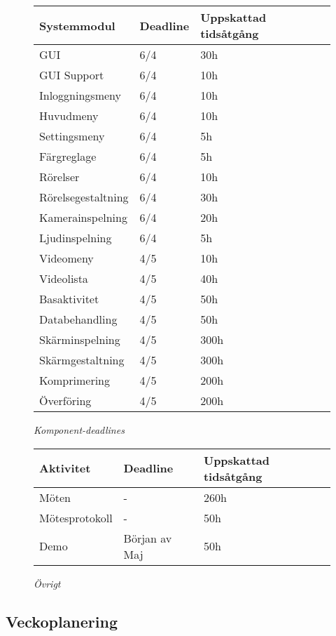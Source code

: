 \begin{figure}[H]
\centering
\begin{tabular}{ | l | l | l |}
  \hline
  \textbf{Systemmodul} & \textbf{Deadline} & \textbf{Uppskattad tidsåtgång} \\ \hline
  GUI & 6/4 & 30h \\ \hline
  GUI Support & 6/4 & 10h \\ \hline
  Inloggningsmeny & 6/4 & 10h \\ \hline
  Huvudmeny & 6/4 & 10h \\ \hline
  Settingsmeny & 6/4 & 5h \\ \hline
  Färgreglage & 6/4 & 5h \\ \hline
  Rörelser & 6/4 & 10h \\ \hline
  Rörelsegestaltning & 6/4 & 30h \\ \hline
  Kamerainspelning & 6/4 & 20h \\ \hline
  Ljudinspelning & 6/4 & 5h \\ \hline
  Videomeny & 4/5 & 10h \\ \hline
  Videolista & 4/5 & 40h \\ \hline
  Basaktivitet & 4/5 & 50h \\ \hline
  Databehandling & 4/5 & 50h \\ \hline
  Skärminspelning & 4/5 & 300h  \\ \hline
  Skärmgestaltning & 4/5 & 300h \\ \hline
  Komprimering & 4/5 & 200h \\ \hline
  Överföring & 4/5 & 200h \\ \hline
\end{tabular}
\caption*{\textit{Komponent-deadlines}}
\end{figure}

\begin{figure}[H]
\centering
\begin{tabular}{ | l | l | l | }
  \hline
  \textbf{Aktivitet} & \textbf{Deadline} & \textbf{Uppskattad tidsåtgång} \\ \hline
  Möten & - & 260h \\ \hline
  Mötesprotokoll & - & 50h \\ \hline
  Demo & Början av Maj & 50h \\ \hline
\end{tabular}
\caption*{\textit{Övrigt}}
\end{figure}

\subsection{Veckoplanering}

